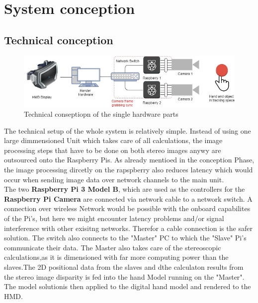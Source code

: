 \chapter{System conception}\section{Technical conception}
\begin{figure}[H]
\includegraphics[width=\textwidth]{images/technical_setup.jpg}
\caption{Technical conseptiopn of the single hardware parts}
\label{technical-copnception}
\end{figure} 
The technical setup of the whole system is relatively simple. Instead of using one large dimmensioned Unit which takes care of all calculations, the image processing steps that have to be done on both stereo images anywy are outsourced onto the Raspberry Pis. As already mentioed in the conception Phase, the image processing dircetly on the rapspberry also reduces latency which would occur when sending image data over network channels to the main unit.\\
The two \textbf{Raspberry Pi 3 Model B}, which are used as the controllers for the \textbf{Raspberry Pi Camera} are connected via network cable to a network switch. A connection over wireless Network would be possible with the onboard capabilites of the  Pi's, but here we might encounter latency problems and/or signal interference with other exisitng networks. Therefor a cable connection is the safer solution.
The switch also connects to the "Master" PC to which the "Slave" Pi's communicate their data. The Master also takes care of the stereoscopic calculations,as it is dimensioned with far more computing power than the slaves.The 2D positional data from the slaves and dthe calculaton results from the stereo image disparity is fed into the hand Model running on the "Master". The model solutionis then applied to the digital hand model and rendered to the HMD.
